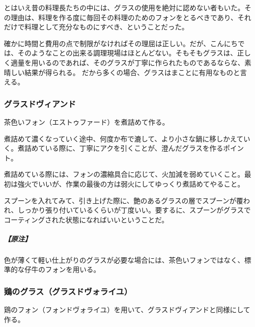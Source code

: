 \begin{recette}
とはいえ昔の料理長たちの中には、グラスの使用を絶対に認めない者もいた。その理由は、料理を作る度に毎回その料理のためのフォンをとるべきであり、それだけで料理として充分なものにすべき、ということだった。

確かに時間と費用の点で制限がなければその理屈は正しい。だが、こんにちでは、そのようなことの出来る調理現場はほとんどない。そもそもグラスは、正しく適量を用いるのであれば、そのグラスが丁寧に作られたものであるならな、素晴しい結果が得られる。
だから多くの場合、グラスはまことに有用なものと言える。

\hypertarget{glace-de-viande}{%
\subsubsection{グラスドヴィアンド}\label{glace-de-viande}}



茶色いフォン（エストゥファード）を煮詰めて作る。

煮詰めて濃くなっていく途中、何度か布で漉して、より小さな鍋に移しかえていく。煮詰めている際に、丁寧にアクを引くことが、澄んだグラスを作るポイント。

煮詰めている際には、フォンの濃縮具合に応じて、火加減を弱めていくこと。最初は強火でいいが、作業の最後の方は弱火にしてゆっくり煮詰めてやること。

スプーンを入れてみて、引き上げた際に、艶のあるグラスの層でスプーンが覆われ、しっかり張り付いているくらいが丁度いい。要するに、スプーンがグラスでコーティングされた状態になればいいということだ。

\hypertarget{nota-glace-de-viande}{%
\subparagraph{【原注】}\label{nota-glace-de-viande}}

色が薄くて軽い仕上がりのグラスが必要な場合には、茶色いフォンではなく、標準的な仔牛のフォンを用いる。

\hypertarget{glace-de-volaille}{%
\subsubsection{鶏のグラス（グラスドヴォライユ）}\label{glace-de-volaille}}



鶏のフォン（フォンドヴォライユ）を用いて、グラスドヴィアンドと同様にして作る。


\end{recette}
